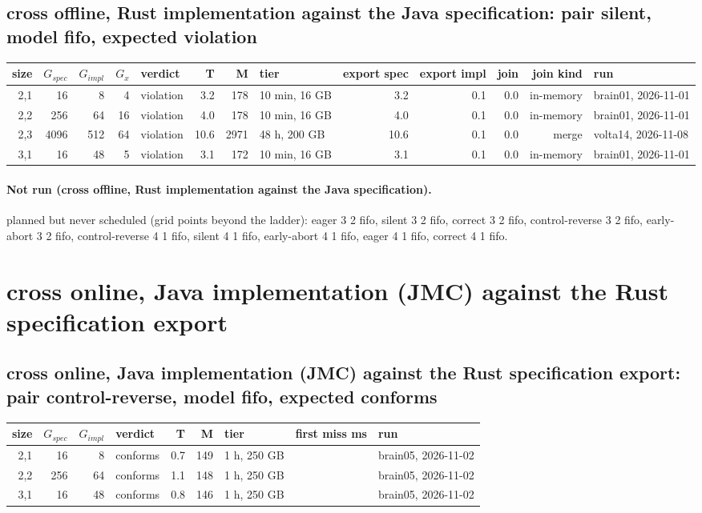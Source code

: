 \documentclass[10pt]{article}
\begin{document}
\subsection*{cross offline, Rust implementation against the Java specification: pair \textsf{silent}, model fifo, expected violation}
\begin{longtable}{@{}rrrrlrrlrrrrl@{}}
\toprule
size & $G_{\mathit{spec}}$ & $G_{\mathit{impl}}$ & $G_x$ & verdict & T & M & tier & export spec & export impl & join & join kind & run \\
\midrule
\endhead
\color{red} 2,1 & 16 & 8 & 4 & violation & 3.2 & 178 & 10 min, 16 GB & 3.2 & 0.1 & 0.0 & in-memory & brain01, 2026-11-01 \\
\color{red} 2,2 & 256 & 64 & 16 & violation & 4.0 & 178 & 10 min, 16 GB & 4.0 & 0.1 & 0.0 & in-memory & brain01, 2026-11-01 \\
\color{red} 2,3 & 4096 & 512 & 64 & violation & 10.6 & 2971 & 48 h, 200 GB & 10.6 & 0.1 & 0.0 & merge & volta14, 2026-11-08 \\
\color{red} 3,1 & 16 & 48 & 5 & violation & 3.1 & 172 & 10 min, 16 GB & 3.1 & 0.1 & 0.0 & in-memory & brain01, 2026-11-01 \\
\bottomrule
\end{longtable}
\paragraph{Not run (cross offline, Rust implementation against the Java specification).}
planned but never scheduled (grid points beyond the ladder): eager 3 2 fifo, silent 3 2 fifo, correct 3 2 fifo, control-reverse 3 2 fifo, early-abort 3 2 fifo, control-reverse 4 1 fifo, silent 4 1 fifo, early-abort 4 1 fifo, eager 4 1 fifo, correct 4 1 fifo.\par
\section*{cross online, Java implementation (JMC) against the Rust specification export}
\subsection*{cross online, Java implementation (JMC) against the Rust specification export: pair \textsf{control-reverse}, model fifo, expected conforms}
\begin{longtable}{@{}rrrlrrlrl@{}}
\toprule
size & $G_{\mathit{spec}}$ & $G_{\mathit{impl}}$ & verdict & T & M & tier & first miss ms & run \\
\midrule
\endhead
\color{red} 2,1 & 16 & 8 & conforms & 0.7 & 149 & 1 h, 250 GB &  & brain05, 2026-11-02 \\
\color{red} 2,2 & 256 & 64 & conforms & 1.1 & 148 & 1 h, 250 GB &  & brain05, 2026-11-02 \\
\color{red} 3,1 & 16 & 48 & conforms & 0.8 & 146 & 1 h, 250 GB &  & brain05, 2026-11-02 \\
\bottomrule
\end{longtable}
\end{document}
